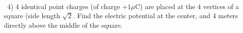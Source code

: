 \documentclass[12pt]{article}
\begin{document}
\\\\\\\\\\\\\\\\\\\\\\\
4) 4 identical point charges (of charge $+1\mu$C) are placed at the 4 vertices of a square (side length $\sqrt{2}$. Find the electric potential at the center, and 4 meters directly above the middle of the square. 
 
\end{document}
